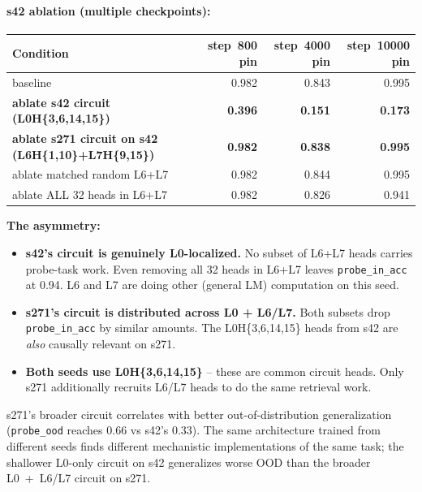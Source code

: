 \documentclass[11pt]{article}
\begin{document}
\paragraph{s42 ablation (multiple checkpoints):}
\begin{center}
\footnotesize
\begin{tabular}{lrrr}
\toprule
Condition & step~800 pin & step~4000 pin & step~10000 pin \\
\midrule
baseline                                                       & 0.982 & 0.843 & 0.995 \\
\textbf{ablate s42 circuit (L0H\{3,6,14,15\})}                 & \textbf{0.396} & \textbf{0.151} & \textbf{0.173} \\
\textbf{ablate s271 circuit on s42 (L6H\{1,10\}+L7H\{9,15\})}  & \textbf{0.982} & \textbf{0.838} & \textbf{0.995} \\
ablate matched random L6+L7                                    & 0.982 & 0.844 & 0.995 \\
ablate ALL 32 heads in L6+L7                                   & 0.982 & 0.826 & 0.941 \\
\bottomrule
\end{tabular}
\end{center}

\textbf{The asymmetry:}

\begin{itemize}[leftmargin=*,topsep=2pt,itemsep=2pt]
\item \textbf{s42's circuit is genuinely L0-localized.} No subset of L6+L7 heads carries probe-task work. Even removing all 32 heads in L6+L7 leaves \texttt{probe\_in\_acc} at 0.94. L6 and L7 are doing other (general LM) computation on this seed.
\item \textbf{s271's circuit is distributed across L0 + L6/L7.} Both subsets drop \texttt{probe\_in\_acc} by similar amounts. The L0H\{3,6,14,15\} heads from s42 are \emph{also} causally relevant on s271.
\item \textbf{Both seeds use L0H\{3,6,14,15\}} -- these are common circuit heads. Only s271 additionally recruits L6/L7 heads to do the same retrieval work.
\end{itemize}

s271's broader circuit correlates with better out-of-distribution generalization (\texttt{probe\_ood} reaches 0.66 vs s42's 0.33). The same architecture trained from different seeds finds different mechanistic implementations of the same task; the shallower L0-only circuit on s42 generalizes worse OOD than the broader L0~+~L6/L7 circuit on s271.
\end{document}
